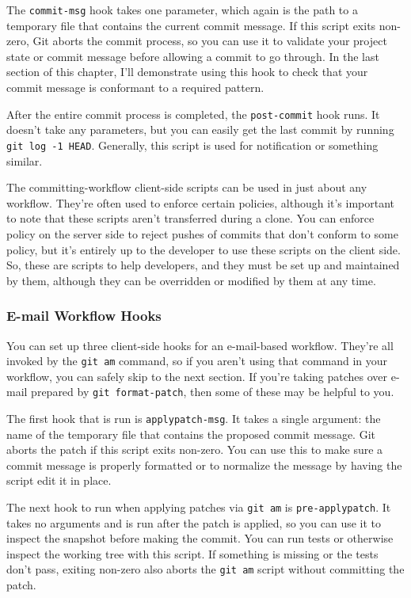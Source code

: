\documentclass[a4paper]{book}
\begin{document}
The \texttt{commit-msg} hook takes one parameter, which again is the path to a temporary file that contains the current commit message. If this script exits non-zero, Git aborts the commit process, so you can use it to validate your project state or commit message before allowing a commit to go through. In the last section of this chapter, I'll demonstrate using this hook to check that your commit message is conformant to a required pattern.

After the entire commit process is completed, the \texttt{post-commit} hook runs. It doesn't take any parameters, but you can easily get the last commit by running \texttt{git log -1 HEAD}. Generally, this script is used for notification or something similar.

The committing-workflow client-side scripts can be used in just about any workflow. They're often used to enforce certain policies, although it's important to note that these scripts aren't transferred during a clone. You can enforce policy on the server side to reject pushes of commits that don't conform to some policy, but it's entirely up to the developer to use these scripts on the client side. So, these are scripts to help developers, and they must be set up and maintained by them, although they can be overridden or modified by them at any time.

\subsubsection{E-mail Workflow Hooks}

You can set up three client-side hooks for an e-mail-based workflow. They're all invoked by the \texttt{git am} command, so if you aren't using that command in your workflow, you can safely skip to the next section. If you're taking patches over e-mail prepared by \texttt{git format-patch}, then some of these may be helpful to you.

The first hook that is run is \texttt{applypatch-msg}. It takes a single argument: the name of the temporary file that contains the proposed commit message. Git aborts the patch if this script exits non-zero. You can use this to make sure a commit message is properly formatted or to normalize the message by having the script edit it in place.

The next hook to run when applying patches via \texttt{git am} is \texttt{pre-applypatch}. It takes no arguments and is run after the patch is applied, so you can use it to inspect the snapshot before making the commit. You can run tests or otherwise inspect the working tree with this script. If something is missing or the tests don't pass, exiting non-zero also aborts the \texttt{git am} script without committing the patch.
\end{document}
